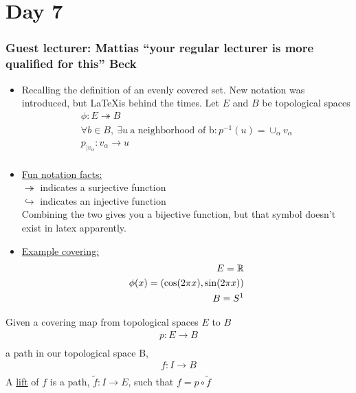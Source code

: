 \section{Day 7}
    \subsubsection{Guest lecturer: Mattias ``your regular lecturer is more qualified for this'' Beck}
    \begin{itemize}
        \item Recalling the definition of an evenly covered set. New notation was introduced, but
            \LaTeX is behind the times.
            Let $E$ and $B$ be topological spaces
            \begin{align*}
                \phi:E \twoheadrightarrow B\\
                \forall b \in B,\ \exists u\ \text{a neighborhood of b}: p^{-1}(u)=\cup_{\alpha}v_\alpha\\
                p_{|v_{\alpha}}: v_{\alpha}\rightarrow u\\
            \end{align*}
        \item \underline{Fun notation facts:}\\
            $\twoheadrightarrow$ indicates a surjective function\\
            $\hookrightarrow$ indicates an injective function\\
            Combining the two gives you a bijective function, but that symbol doesn't exist
            in latex apparently.
        \item \underline{Example covering:}
            \begin{align*}
                E=\mathbb{R}\\
                \phi(x)=(\cos(2\pi x), \sin(2\pi x))\\
                B=S^{1}\\
            \end{align*}
    \end{itemize}
            \begin{definition} Given a covering map from topological
                spaces $E$ to $B$
                \begin{align*}
                    p: E\rightarrow B\\
                \end{align*}
                    a path in our topological space B,
                \begin{align*}
                    f: I \rightarrow B\\
                \end{align*}
                A \underline{lift} of $f$ is a path, $\tilde{f}: I\rightarrow E$, such that
                $f=p\circ \tilde{f}$
            \end{definition}
